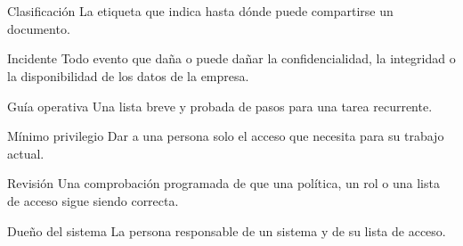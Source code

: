 \clearpage
\section*{\lblGlossary}
\begin{termlist}
  \item[Clasificación] La etiqueta que indica hasta dónde puede compartirse un documento.
  \item[Incidente] Todo evento que daña o puede dañar la confidencialidad, la integridad o la disponibilidad de los datos de la empresa.
  \item[Guía operativa] Una lista breve y probada de pasos para una tarea recurrente.
  \item[Mínimo privilegio] Dar a una persona solo el acceso que necesita para su trabajo actual.
  \item[Revisión] Una comprobación programada de que una política, un rol o una lista de acceso sigue siendo correcta.
  \item[Dueño del sistema] La persona responsable de un sistema y de su lista de acceso.
\end{termlist}
